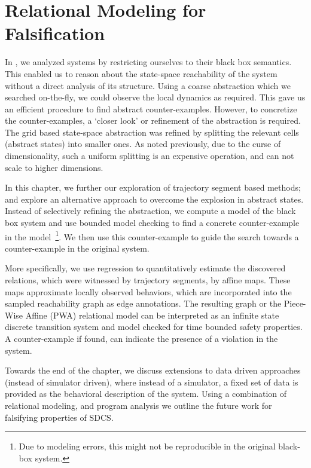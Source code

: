 \newcommand{\pwa}{\rho}
\newcommand{\map}{f}
\newcommand{\amap}{f}
\newcommand{\gm}{\scr{T}}
\newcommand{\guard}{g}
\newcommand{\ds}{\scr{D}}

\chapter{Relational Modeling for Falsification}
\label{chap:rel}

In , we analyzed systems by restricting ourselves to
their black box semantics. This enabled us to reason about the
state-space reachability of the system without a direct analysis of
its structure. Using a coarse abstraction which we searched
on-the-fly, we could observe the local dynamics as required. This gave
us an efficient procedure to find abstract counter-examples.  However,
to concretize the counter-examples, a `closer look' or refinement of
the abstraction is required. The grid based state-space abstraction
was refined by splitting the relevant cells (abstract states) into
smaller ones. As noted previously, due to the curse of dimensionality,
such a uniform splitting is an expensive operation, and can not scale to
higher dimensions.

In this chapter, we further our exploration of trajectory segment
based methods; and explore an alternative approach to overcome the
explosion in abstract states. Instead of selectively refining the
abstraction, we compute a model of the black box system and use
bounded model checking to find a concrete counter-example in the
model~\footnote{Due to modeling errors, this might not be reproducible in
the original black-box system.}. We then use this counter-example to
guide the search towards a counter-example in the original system.

More specifically, we use regression to quantitatively estimate the
discovered relations, which were witnessed by trajectory segments, by
affine maps. These maps approximate locally observed behaviors, which
are incorporated into the sampled reachability graph as edge
annotations.  The resulting graph or the Piece-Wise Affine (PWA)
relational model can be interpreted as an infinite state discrete
transition system and model checked for time bounded safety
properties. A counter-example if found, can indicate the presence of a
violation in the system.

Towards the end of the chapter, we discuss extensions to data driven
approaches (instead of simulator driven), where instead of a
simulator, a fixed set of data is provided as the behavioral
description of the system. Using a combination of relational modeling,
and program analysis we outline the future work for falsifying
properties of SDCS.

